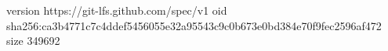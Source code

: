 version https://git-lfs.github.com/spec/v1
oid sha256:ca3b4771c7c4ddef5456055e32a95543c9c0b673e0bd384e70f9fec2596af472
size 349692
